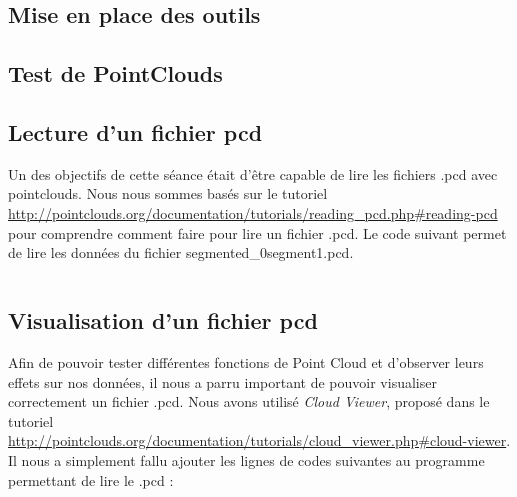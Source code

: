 \subsection{Mise en place des outils}

\subsection{Test de PointClouds}

\subsection{Lecture d'un fichier pcd}
	Un des objectifs de cette séance était d'être capable de lire les fichiers .pcd avec pointclouds. Nous nous sommes basés sur le tutoriel \url{http://pointclouds.org/documentation/tutorials/reading_pcd.php#reading-pcd} pour comprendre comment faire pour lire un fichier .pcd. Le code suivant permet de lire les données du fichier segmented\_0segment1.pcd.

	\inputminted[tabsize=4,linenos,fontsize=\small]{cpp}{../tests/lecture_data/pcd_read.cpp}

\subsection{Visualisation d'un fichier pcd}
	Afin de pouvoir tester différentes fonctions de Point Cloud et d'observer leurs effets sur nos données, il nous a parru important de pouvoir visualiser correctement un fichier .pcd. Nous avons utilisé \emph{Cloud Viewer}, proposé dans le tutoriel \url{http://pointclouds.org/documentation/tutorials/cloud_viewer.php#cloud-viewer}. Il nous a simplement fallu ajouter les lignes de codes suivantes au programme permettant de lire le .pcd :

	\inputminted[tabsize=4,linenos,fontsize=\small]{cpp}{code/visualisation.cpp}